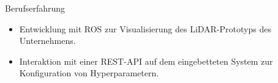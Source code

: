 \begin{rubric}{Berufserfahrung}
\vspace{\CVItemizeHeaderSpacing} \begin{itemize}[leftmargin=*, rightmargin=1cm]
	\setlength{\itemsep}{\CVItemizeSpacing}  
	\item Entwicklung mit ROS zur Visualisierung des LiDAR-Prototyps des Unternehmens.  
	\item Interaktion mit einer REST-API auf dem eingebetteten System zur Konfiguration von Hyperparametern.  
\end{itemize}
\begin{comment}
%
%
\entry*[] \textbf{Creative Edge LLC} \hfill 08.2017 -- 09.2018 \newline  
 \emph{Softwareentwickler} \hfill Denver, USA \newline  
\vspace{\CVItemizeHeaderSpacing} \begin{itemize}[leftmargin=*, rightmargin=1cm] 
	\setlength{\itemsep}{\CVItemizeSpacing}  
	\item Entwicklung von Anwendungen für das Kryptowährungs-Mining unter Windows und Linux.  
	\item Erstellung von Software zur Verwaltung von Betriebssystemtreibern,  System- ~~~~~~~~~~~~konfigurationen und Tools von Drittanbietern.  
\end{itemize}

\end{comment}

\end{rubric}
